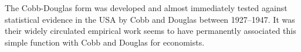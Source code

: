 

The Cobb-Douglas form was developed and almost immediately tested against statistical evidence in the USA by Cobb and Douglas between 1927--1947. It was  their widely circulated empirical work seems to have permanently associated this simple function with Cobb and Douglas for economists.






